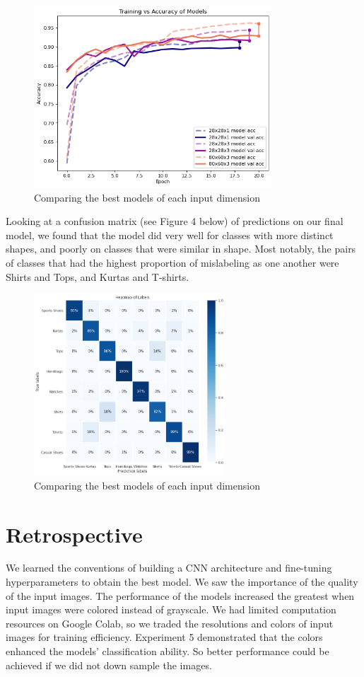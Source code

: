 \documentclass[twoside,twocolumn,9pt]{article}
\begin{document}
\begin{figure}[h]
\centering
  \includegraphics[height=6.8cm]{images/exp5}
  \caption{Comparing the best models of each input dimension}
  \label{fgr:example}
\end{figure}

\noindent Looking at a confusion matrix (see Figure 4 below) of predictions on our final model, we found that the model did very well for classes with more distinct shapes, and poorly on classes that were similar in shape. Most notably, the pairs of classes that had the highest proportion of mislabeling as one another were Shirts and Tops, and Kurtas and T-shirts.

\begin{figure}
\centering
  \includegraphics[height=6.8cm]{images/matrix}
  \caption{Comparing the best models of each input dimension}
  \label{fgr:example2col}
\end{figure}

\section{Retrospective}
We learned the conventions of building a CNN architecture and fine-tuning hyperparameters to obtain the best model. We saw the importance of the quality of the input images. The performance of the models increased the greatest when input images were colored instead of grayscale. We had limited computation resources on Google Colab, so we traded the resolutions and colors of input images for training efficiency. Experiment 5 demonstrated that the colors enhanced the models' classification ability. So better performance could be achieved if we did not down sample the images.
\end{document}
